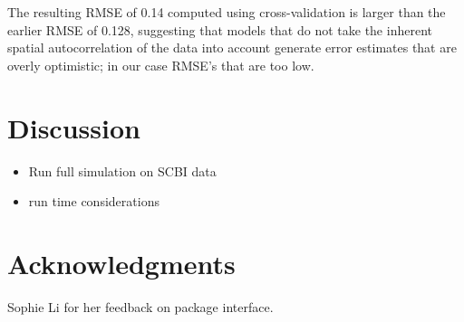 \documentclass[12pt]{article}
\providecommand{\tightlist}{%
  \setlength{\itemsep}{0pt}\setlength{\parskip}{0pt}}
\newenvironment{Shaded}{\begin{snugshade}}{\end{snugshade}}
\newcommand{\CommentTok}[1]{\textcolor[rgb]{0.56,0.35,0.01}{\textit{#1}}}
\newcommand{\DataTypeTok}[1]{\textcolor[rgb]{0.13,0.29,0.53}{#1}}
\newcommand{\KeywordTok}[1]{\textcolor[rgb]{0.13,0.29,0.53}{\textbf{#1}}}
\newcommand{\NormalTok}[1]{#1}
\newcommand{\OperatorTok}[1]{\textcolor[rgb]{0.81,0.36,0.00}{\textbf{#1}}}
\newcommand{\StringTok}[1]{\textcolor[rgb]{0.31,0.60,0.02}{#1}}
\begin{document}
\begin{Shaded}
\end{Shaded}

\begin{Shaded}
\end{Shaded}

The resulting RMSE of 0.14 computed using cross-validation is larger
than the earlier RMSE of 0.128, suggesting that models that do not take
the inherent spatial autocorrelation of the data into account generate
error estimates that are overly optimistic; in our case RMSE's that are
too low.

\hypertarget{discussion}{%
\section{Discussion}\label{discussion}}

\begin{itemize}
\tightlist
\item
  Run full simulation on SCBI data
\item
  run time considerations
\end{itemize}

\hypertarget{acknowledgments}{%
\section{Acknowledgments}\label{acknowledgments}}

Sophie Li for her feedback on package interface.



\end{document}
